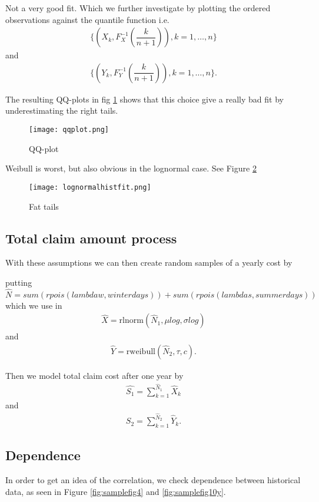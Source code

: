 \documentclass[11pt]{article}
\begin{document}
Not a very good fit. Which we further investigate by plotting  the ordered observations against the quantile function  i.e.
\begin{align*}
	\bigg\{ \left( X_k, F_X^{-1}\left(\dfrac{k}{n+1}\right)\right),k=1,\dots,n \bigg\}
\end{align*}
and
\begin{align*}
	\bigg\{ \left( Y_k, F_Y^{-1}\left(\dfrac{k}{n+1}\right)\right),k=1,\dots,n \bigg\}.
\end{align*}

The resulting QQ-plots in fig \ref{fig:qqplot} shows that this choice give a really bad fit by underestimating the right tails.

 \begin{figure}[h]
 \center
  \texttt{[image: qqplot.png]}
  \caption{QQ-plot}
  \label{fig:qqplot}
\end{figure}

Weibull is worst, but also obvious in the lognormal case. See Figure \ref{fig:fit}
 \begin{figure}[H]
 \center
  \texttt{[image: lognormalhistfit.png]}
  \caption{Fat tails}
  \label{fig:fit}
\end{figure}

\subsection*{Total claim amount process}
With these assumptions we can then
 create random samples of a yearly cost by

putting $\hat{N} =  sum(rpois(lambdaw,winterdays)) +  sum(rpois(lambdas,summerdays))$
which we use in
\begin{align*} 
	\hat{X} = \mathrm{rlnorm}(\hat{N}_1,\mu log,\sigma log) 
\end{align*}
and
\begin{align*} 
	 \hat{Y} =\mathrm{ rweibull}(\hat{N}_2,\tau,c).
\end{align*}

Then we model total claim cost after one year by
\begin{align} \label{eq:sum12}
	\hat{S_1} = \sum_{k=1}^{\hat{N}_1} \hat{ X}_k   
\end{align}
and
\begin{align} \label{eq:sum22}
	 \hat{S_2} = \sum_{k=1}^{\hat{N}_2} \hat{Y}_k.
\end{align}


\subsection*{Dependence}
In order to get an idea of the correlation, we check dependence between historical data,
as seen in Figure \ref{fig:samplefig4} and  \ref{fig:samplefig10y}.
\end{document}
